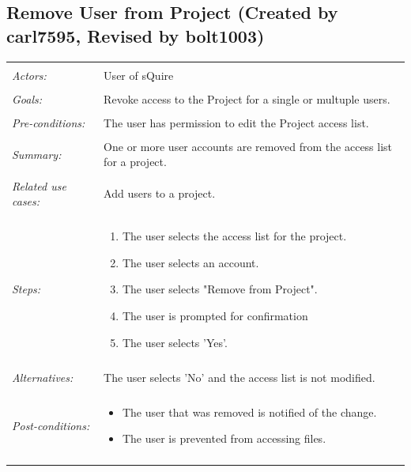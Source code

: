 \documentclass[11pt]{report}
\begin{document}
\subsection{Remove User from Project (Created by carl7595, Revised by bolt1003)}
\begin{tabular}{ p{2cm} p{12cm} }   
 \hline
 \\
 \textit{Actors:} & User of sQuire \\
 \\
 \textit{Goals:} & Revoke access to the Project for a single or multuple users. \\
 \\
 \textit{Pre-conditions:} & The user has permission to edit the Project access list. \\
 \\
 \textit{Summary:} & One or more user accounts are removed from the access list for a project. \\ 
 \\
 \textit{Related use cases:} & Add users to a project.  \\ 
 \\
 \textit{Steps:} & \begin{enumerate}
  \item The user selects the access list for the project.
	 \item The user selects an account. 
	 \item The user selects "Remove from Project".
	 \item The user is prompted for confirmation
	 \item The user selects 'Yes'.
 \end{enumerate} \\
 \\
 \textit{Alternatives:} & The user selects 'No' and the access list is not modified. \\
 \\
 \textit{Post-conditions:} &
    \begin{itemize}
	 \item The user that was removed is notified of the change.
	 \item The user is prevented from accessing files.
    \end{itemize}\\
 \\
\hline
\end{tabular}
\end{document}
